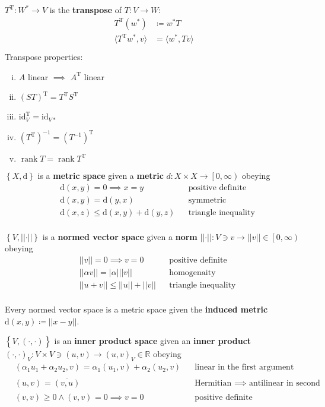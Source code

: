 \documentclass[letterpaper,11pt]{amsart}
\newcommand{\norm}[1]{\left|\left|{#1}\right|\right|}
\newcommand{\abs}[1]{\left|{#1}\right|}
\newcommand{\T}{\textrm{T}}
\newcommand{\dualpair}[3][]{{\langle{}{#2},{#3}\rangle{}}_{#1}\xspace{}}
\newcommand{\innerprod}[3][]{{\left({#2},{#3}\right)}_{#1}\xspace{}}
\newcommand{\dist}[2]{\textrm{d}\left( {#1}, {#2} \right)}
\newcommand{\reals}{\mathbb{R}}
\newcommand{\keyphrase}[1]{\textbf{#1}}
\DeclareMathOperator{\rank}{rank}
\begin{document}
$T^{\T}:W^{*}\to{}V$ is the \keyphrase{transpose} of $T:V\to{}W$:
\begin{align*}
    T^{\T}\left( w^{*} \right) &\coloneqq w^{*}T \\
    \dualpair{T^{\T}w^{*}}{v} &= \dualpair{w^{*}}{Tv} \\
\end{align*}
Transpose properties:
\begin{enumerate}[(i)]
    \item $A$ linear $\implies$ $A^{\T}$ linear
    \item $\left( S T \right)^{\T} = T^{\T}S^{\T}$
    \item $\textrm{id}_{V}^{\T} = \textrm{id}_{V*}$
    \item $\left( T^{\T} \right)^{-1} = \left( T^{-1} \right)^{\T}$
    \item $\rank T = \rank T^{\T}$
\end{enumerate}

$\left\{ X, \textrm{d} \right\}$ is a \keyphrase{metric space}
given a \keyphrase{metric} $d:X\times{}X\to{}\left[ 0,\infty\right)$ obeying
\begin{align*}
    &\dist{x}{y} = 0 \implies x=y & &\text{positive definite} \\
    &\dist{x}{y} = \dist{y}{x} & &\text{symmetric} \\
    &\dist{x}{z} \leq \dist{x}{y} + \dist{y}{z} & &\text{triangle inequality} \\
\end{align*}

$\left\{ V, \norm{\cdot} \right\}$ is a 
\keyphrase{normed vector space} given a \keyphrase{norm} 
$\norm{\cdot}:V\ni{}v\to{}\norm{v}\in\left[ 0,\infty\right)$ obeying
\begin{align*}
    &\norm{v} = 0 \implies v=0 & &\text{positive definite} \\
    &\norm{\alpha v} = \abs{\alpha}\norm{v} & &\text{homogenaity} \\
    &\norm{u+v} \leq \norm{u} + \norm{v} & &\text{triangle inequality} \\
\end{align*}

Every normed vector space is a metric space given the \keyphrase{induced metric}
$\dist{x}{y} \coloneqq \norm{x-y}$.

$\left\{ V, \innerprod{\cdot}{\cdot} \right\}$ is an
\keyphrase{inner product space} given an
\keyphrase{inner product} 
$\innerprod[V]{\cdot}{\cdot}:V\times{}V\ni(u,v)\to\innerprod[V]{u}{v}\in\reals$
obeying
\begin{align*}
    &\innerprod{\alpha_{1}u_{1}+\alpha_{2}u_{2}}{v}
    = \alpha_{1}\innerprod{u_{1}}{v} + \alpha_{2}\innerprod{u_{2}}{v}
    & &\text{linear in the first argument} \\
    &\innerprod{u}{v} = \overline{\innerprod{v}{u}}
    & &\text{Hermitian $\implies$ antilinear in second argument} \\
    &\innerprod{v}{v} \geq 0 \wedge \innerprod{v}{v}=0 \implies v=0
    & &\text{positive definite} \\
\end{align*}
\end{document}
